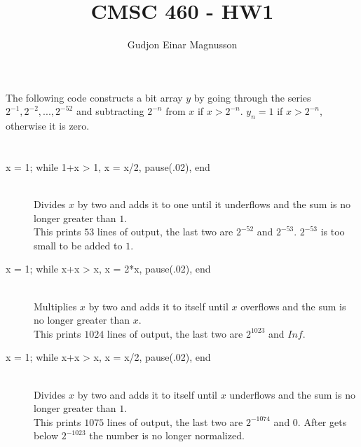 \documentclass[12pt]{article}
\begin{document}
\title{CMSC 460 - HW1}
\author{Gudjon Einar Magnusson}

\maketitle

\section{}

The following code constructs a bit array $y$ by going through the series $2^{-1}, 2^{-2}, ... ,2^{-52}$ and subtracting $2^{-n}$ from $x$ if $x > 2^{-n}$. $y_{n} = 1$ if $x > 2^{-n}$, otherwise it is zero.

\begin{minipage}{\linewidth}

\end{minipage}

\section{}

\subsection{}

\begin{description}
	\item[x = 1; while 1+x > 1, x = x/2, pause(.02), end] \hfill \\
	Divides $x$ by two and adds it to one until it underflows and the sum is no longer greater than $1$.\\
This prints $53$ lines of output, the last two are $2^{-52}$ and $2^{-53}$. $2^{-53}$ is too small to be added to $1$.

	\item[x = 1; while x+x > x, x = 2*x, pause(.02), end] \hfill \\
	Multiplies $x$ by two and adds it to itself until $x$ overflows and the sum is no longer greater than $x$.\\
This prints $1024$ lines of output, the last two are $2^{1023}$ and $Inf$.

	\item[x = 1; while x+x > x, x = x/2, pause(.02), end] \hfill \\
	Divides $x$ by two and adds it to itself until $x$ underflows and the sum is no longer greater than $1$.\\
This prints $1075$ lines of output, the last two are $2^{-1074}$ and $0$. After gets below $2^{-1023}$ the number is no longer normalized.

\end{description}
\end{document}
